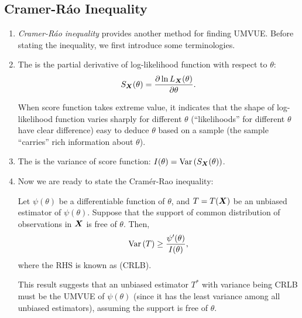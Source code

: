 \subsection{Cramer-R\'{a}o Inequality}
\begin{enumerate}
\item \emph{Cramer-R\'{a}o inequality} provides another method for finding
UMVUE. Before stating the inequality, we first introduce some terminologies.

\item The  is the partial derivative of log-likelihood
function with respect to \(\theta\):
\[
S_{\vb*{X}}(\theta)=\pdv{\ln L_{\vb*{X}}\qty(\theta)}{\theta}.
\]
\begin{note}
When score function takes extreme value, it indicates that the shape of
log-likelihood function varies sharply for different \(\theta\)
(``likelihoods'' for different \(\theta\) have clear difference)
 easy to deduce \(\theta\) based on a sample (the sample
``carries'' rich information about \(\theta\)).
\end{note}
\item The  is the variance of score function:
\(I(\theta)=\operatorname{Var}\qty(S_{\vb*{X}}(\theta))\).

\item Now we are ready to state the Cram\'{e}r-Rao inequality:
\begin{theorem}
\label{thm:cramer-rao-ineq}
Let \(\psi(\theta)\) be a differentiable function of \(\theta\), and
\(T=T(\vb*{X})\) be an unbiased estimator of \(\psi(\theta)\). Suppose that
the support of common distribution of observations in \(\vb*{X}\) is free of
\(\theta\). Then,
\[
\operatorname{Var}\qty(T)\ge\frac{\psi'(\theta)}{I(\theta)},
\]
where the RHS is known as  (CRLB).
\end{theorem}
\begin{note}
This result suggests that an unbiased estimator \(T^*\) with variance being
CRLB must be the UMVUE of \(\psi(\theta)\) (since it has the least variance
among all unbiased estimators), assuming the support is free of \(\theta\).
\end{note}
\end{enumerate}
